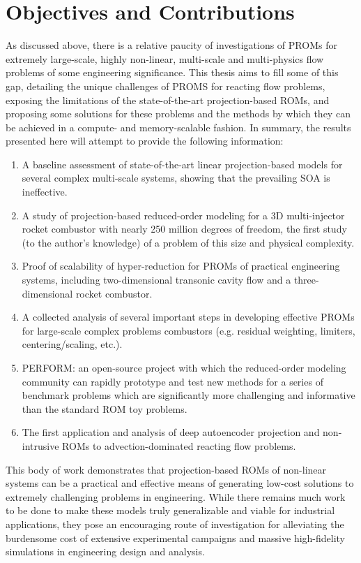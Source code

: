 \section{Objectives and Contributions}

As discussed above, there is a relative paucity of investigations of PROMs for extremely large-scale, highly non-linear, multi-scale and multi-physics flow problems of some engineering significance. This thesis aims to fill some of this gap, detailing the unique challenges of PROMS for reacting flow problems, exposing the limitations of the state-of-the-art projection-based ROMs, and proposing some solutions for these problems and the methods by which they can be achieved in a compute- and memory-scalable fashion. In summary, the results presented here will attempt to provide the following information:

\begin{enumerate}
    \item A baseline assessment of state-of-the-art linear projection-based models for several complex multi-scale systems, showing that the prevailing SOA is ineffective.
    \item A study of projection-based reduced-order modeling for a 3D multi-injector rocket combustor with nearly 250 million degrees of freedom, the first study (to the author's knowledge) of a problem of this size and physical complexity.
    \item Proof of scalability of hyper-reduction for PROMs of practical engineering systems, including two-dimensional transonic cavity flow and a three-dimensional rocket combustor.
    \item A collected analysis of several important steps in developing effective PROMs for large-scale complex problems combustors (e.g. residual weighting, limiters, centering/scaling, etc.).
    \item PERFORM: an open-source project with which the reduced-order modeling community can rapidly prototype and test new methods for a series of benchmark problems which are significantly more challenging and informative than the standard ROM toy problems.
    \item The first application and analysis of deep autoencoder projection and non-intrusive ROMs to advection-dominated reacting flow problems.
\end{enumerate}

This body of work demonstrates that projection-based ROMs of non-linear systems can be a practical and effective means of generating low-cost solutions to extremely challenging problems in engineering. While there remains much work to be done to make these models truly generalizable and viable for industrial applications, they pose an encouraging route of investigation for alleviating the burdensome cost of extensive experimental campaigns and massive high-fidelity simulations in engineering design and analysis.